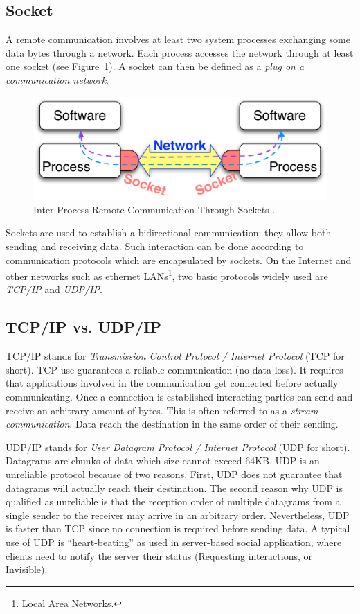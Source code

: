 \documentclass[a4paper,10pt,twoside]{book}
\begin{document}
\subsection{Socket}
A remote communication involves at least two system processes exchanging some data bytes through a network. Each process accesses the network through at least one socket (see Figure~\ref{fig:socketConcept}).
A socket can then be defined as a \textit{plug on a communication network}.

\begin{figure}[ht]\centering
	\includegraphics[width=.75\linewidth]{socketConcept}
	\caption{Inter-Process Remote Communication Through Sockets .}
	\label{fig:socketConcept}
\end{figure}

Sockets are used to establish a bidirectional communication: they allow both sending and receiving data. 
Such interaction can be done according to communication protocols which are encapsulated by sockets. On the Internet and other networks such as ethernet LANs\footnote{Local Area Networks.}, two basic protocols widely used are \textit{TCP/IP} and \textit{UDP/IP}.

\subsection{TCP/IP vs. UDP/IP}
TCP/IP stands for \textit{Transmission Control Protocol / Internet Protocol} (TCP for short).
TCP use guarantees a reliable communication (no data loss). It requires that applications involved in the communication get connected before actually communicating. 
Once a connection is established interacting parties can send and receive an arbitrary amount of bytes. This is often referred to as a \textit{stream communication}.
Data reach the destination in the same order of their sending.

UDP/IP stands for \textit{User Datagram Protocol / Internet Protocol} (UDP for short).
Datagrams are chunks of data which size cannot exceed 64KB. UDP is an unreliable protocol because of two reasons. First, UDP does not guarantee that  datagrams will actually reach their destination.
The second reason why UDP is qualified as unreliable is that the reception order of multiple datagrams from a single sender to the receiver may arrive in an arbitrary order.
Nevertheless, UDP is faster than TCP since no connection is required before sending data.
A typical use of UDP is  ``heart-beating'' as used in server-based social application, where clients need to notify the server their status (\eg Requesting interactions, or Invisible).
\end{document}
